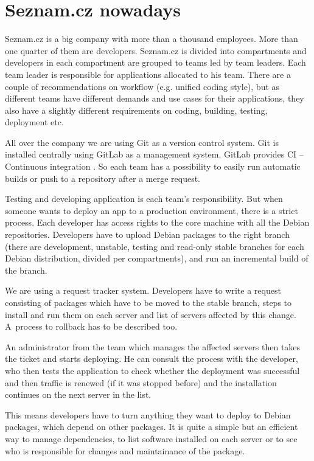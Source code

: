 \chapter{Seznam.cz nowadays}\label{chapter:seznam-nowadays}

Seznam.cz is a big company with more than a thousand employees. More than one quarter of them are developers. Seznam.cz is divided into compartments and developers in each compartment are grouped to teams led by team leaders. Each team leader is responsible for applications allocated to his team. There are a couple of recommendations on workflow (e.g. unified coding style),  but as different teams have different demands and use cases for their applications, they also have a slightly different requirements on coding, building, testing, deployment etc.

All over the company we are using Git as a version control system. Git is installed centrally using GitLab as a management system. GitLab provides CI – Continuous integration \cite{gitlabci}.
So each team has a possibility to easily run automatic builds or push to a repository after a merge request.

Testing and developing application is each team’s responsibility. But when someone wants to deploy an app to a production environment, there is a strict process. Each developer has access rights to the core machine with all the Debian \cite{debian} repositories. Developers have to upload Debian packages to the right branch (there are development, unstable, testing and read-only stable branches for each Debian distribution, divided per compartments), and run an incremental build of the branch.

We are using a request tracker system. Developers have to write a request consisting of packages which have to be moved to the stable branch, steps to install and run them on each server and list of servers affected by this change. A~process to rollback has to be described too.

An administrator from the team which manages the affected servers then takes the ticket and starts deploying. He can consult the process with the developer, who then tests the application to check whether the deployment was successful and then traffic is renewed (if it was stopped before) and the installation continues on the next server in the list.

This means developers have to turn anything they want to deploy to Debian packages, which depend on other packages. It is quite a simple but an efficient way to manage dependencies, to list software installed on each server or to see who is responsible for changes and maintainance of the package.

